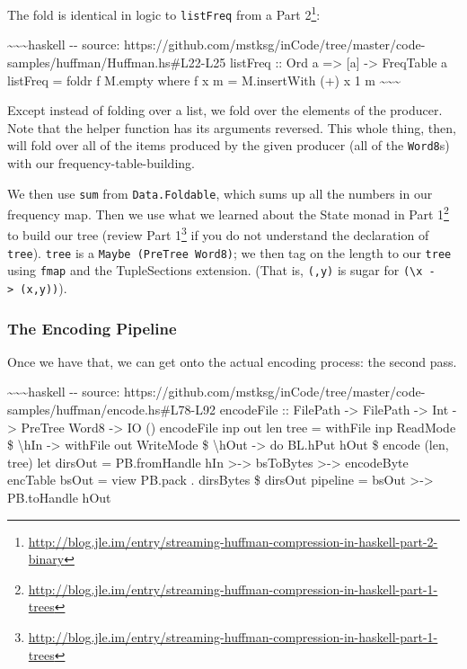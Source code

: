 \documentclass[]{article}
\renewcommand{\href}[2]{#2\footnote{\url{#1}}}
\begin{document}
The fold is identical in logic to \texttt{listFreq} from a
\href{http://blog.jle.im/entry/streaming-huffman-compression-in-haskell-part-2-binary}{Part
2}:

\textasciitilde{}\textasciitilde{}\textasciitilde{}haskell -\/- source:
https://github.com/mstksg/inCode/tree/master/code-samples/huffman/Huffman.hs\#L22-L25
listFreq :: Ord a =\textgreater{} {[}a{]} -\textgreater{} FreqTable a listFreq =
foldr f M.empty where f x m = M.insertWith (+) x 1 m
\textasciitilde{}\textasciitilde{}\textasciitilde{}

Except instead of folding over a list, we fold over the elements of the
producer. Note that the helper function has its arguments reversed. This whole
thing, then, will fold over all of the items produced by the given producer (all
of the \texttt{Word8}s) with our frequency-table-building.

We then use \texttt{sum} from \texttt{Data.Foldable}, which sums up all the
numbers in our frequency map. Then we use what we learned about the State monad
in
\href{http://blog.jle.im/entry/streaming-huffman-compression-in-haskell-part-1-trees}{Part
1} to build our tree (review
\href{http://blog.jle.im/entry/streaming-huffman-compression-in-haskell-part-1-trees}{Part
1} if you do not understand the declaration of \texttt{tree}). \texttt{tree} is
a \texttt{Maybe\ (PreTree\ Word8)}; we then tag on the length to our
\texttt{tree} using \texttt{fmap} and the TupleSections extension. (That is,
\texttt{(,y)} is sugar for
\texttt{(\textbackslash{}x\ -\textgreater{}\ (x,y))}).

\subsubsection{The Encoding Pipeline}

Once we have that, we can get onto the actual encoding process: the second pass.

\textasciitilde{}\textasciitilde{}\textasciitilde{}haskell -\/- source:
https://github.com/mstksg/inCode/tree/master/code-samples/huffman/encode.hs\#L78-L92
encodeFile :: FilePath -\textgreater{} FilePath -\textgreater{} Int
-\textgreater{} PreTree Word8 -\textgreater{} IO () encodeFile inp out len tree
= withFile inp ReadMode \$ \textbackslash{}hIn -\textgreater{} withFile out
WriteMode \$ \textbackslash{}hOut -\textgreater{} do BL.hPut hOut \$ encode
(len, tree) let dirsOut = PB.fromHandle hIn \textgreater{}-\textgreater{}
bsToBytes \textgreater{}-\textgreater{} encodeByte encTable bsOut = view PB.pack
. dirsBytes \$ dirsOut pipeline = bsOut \textgreater{}-\textgreater{}
PB.toHandle hOut
\end{document}
